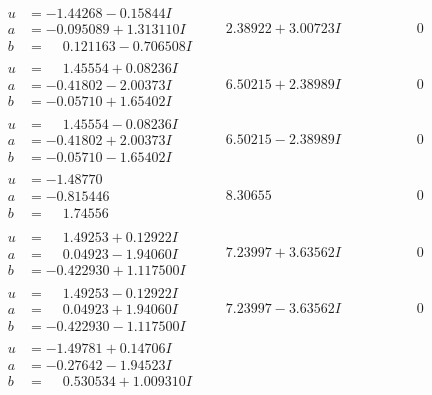 \documentclass[1p]{elsarticle_modified}
\theoremstyle{definition}
\begin{document}
$$\begin{array}{c|c|c}
\begin{aligned}
u &= -1.44268 - 0.15844 I \\
a &= -0.095089 + 1.313110 I \\
b &= \phantom{-}0.121163 - 0.706508 I\end{aligned}
 & \phantom{-}2.38922 + 3.00723 I & \phantom{-0.000000 } 0 \\ \hline\begin{aligned}
u &= \phantom{-}1.45554 + 0.08236 I \\
a &= -0.41802 - 2.00373 I \\
b &= -0.05710 + 1.65402 I\end{aligned}
 & \phantom{-}6.50215 + 2.38989 I & \phantom{-0.000000 } 0 \\ \hline\begin{aligned}
u &= \phantom{-}1.45554 - 0.08236 I \\
a &= -0.41802 + 2.00373 I \\
b &= -0.05710 - 1.65402 I\end{aligned}
 & \phantom{-}6.50215 - 2.38989 I & \phantom{-0.000000 } 0 \\ \hline\begin{aligned}
u &= -1.48770\phantom{ +0.000000I} \\
a &= -0.815446\phantom{ +0.000000I} \\
b &= \phantom{-}1.74556\phantom{ +0.000000I}\end{aligned}
 & \phantom{-}8.30655\phantom{ +0.000000I} & \phantom{-0.000000 } 0 \\ \hline\begin{aligned}
u &= \phantom{-}1.49253 + 0.12922 I \\
a &= \phantom{-}0.04923 - 1.94060 I \\
b &= -0.422930 + 1.117500 I\end{aligned}
 & \phantom{-}7.23997 + 3.63562 I & \phantom{-0.000000 } 0 \\ \hline\begin{aligned}
u &= \phantom{-}1.49253 - 0.12922 I \\
a &= \phantom{-}0.04923 + 1.94060 I \\
b &= -0.422930 - 1.117500 I\end{aligned}
 & \phantom{-}7.23997 - 3.63562 I & \phantom{-0.000000 } 0 \\ \hline\begin{aligned}
u &= -1.49781 + 0.14706 I \\
a &= -0.27642 - 1.94523 I \\
b &= \phantom{-}0.530534 + 1.009310 I\end{aligned}

\end{array}$$
\end{document}
